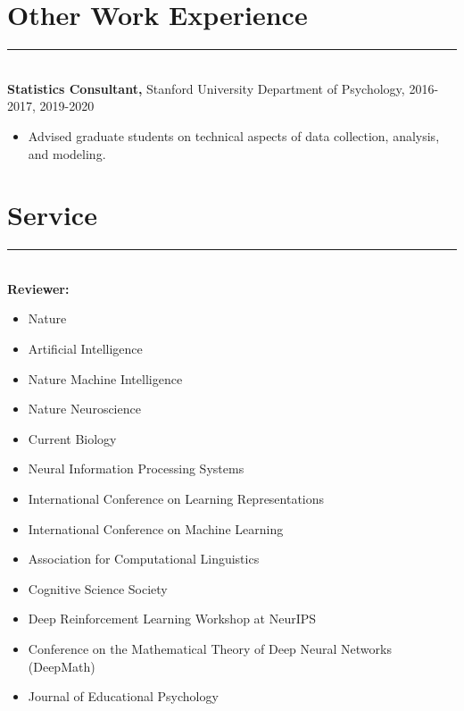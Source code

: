 \documentclass[margin]{res}
\begin{document}
\begin{resume}
\vspace{1pt}\section{Other Work Experience} \vspace{-15pt} \rule{\textwidth}{0.5pt} \\[3pt]
{\bf Statistics Consultant,} Stanford University Department of Psychology, 2016-2017, 2019-2020
\begin{itemize} \itemsep -2pt
 \item Advised graduate students on technical aspects of data collection, analysis, and modeling. \end{itemize}
\vspace{1pt}\section{Service} \vspace{-15pt} \rule{\textwidth}{0.5pt} \\[3pt]
{\bf Reviewer:} 
\begin{itemize} \itemsep -2pt
 \item Nature
 \item Artificial Intelligence
 \item Nature Machine Intelligence 
 \item Nature Neuroscience 
 \item Current Biology 
 \item Neural Information Processing Systems
 \item International Conference on Learning Representations 
 \item International Conference on Machine Learning
 \item Association for Computational Linguistics
 \item Cognitive Science Society
 \item Deep Reinforcement Learning Workshop at NeurIPS
 \item Conference on the Mathematical Theory of Deep Neural Networks (DeepMath)
 \item Journal of Educational Psychology
 \end{itemize}

\end{resume}
\end{document}
